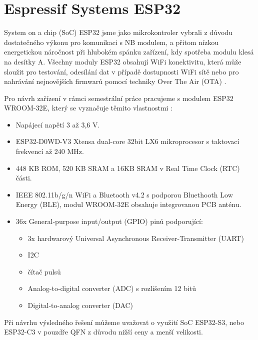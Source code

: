 \section{Espressif Systems ESP32}
\par System on a chip (SoC) ESP32 jsme jako mikrokontroler vybrali z důvodu dostatečného výkonu pro komunikaci s NB modulem, a přitom nízkou energetickou náročnost při hlubokém spánku zařízení, kdy spotřeba modulu klesá na desítky \mikro A. Všechny moduly ESP32 obsahují WiFi konektivitu, která může sloužit pro testování, odesílání dat v případě dostupnosti WiFi sítě nebo pro nahrávání nejnovějších firmwarů pomocí techniky Over The Air (OTA) \cite{UtwRiZcdaaRkidVE}.
\par Pro návrh zařízení v rámci semestrální práce pracujeme s modulem ESP32 WROOM-32E, který se vyznačuje těmito vlastnostmi \cite{UtwRiZcdaaRkidVE}:
    \begin{itemize}
        \item Napájecí napětí 3 až 3,6 V.
        \item ESP32-D0WD-V3 Xtensa dual-core 32bit LX6 mikroprocesor s taktovací frekvencí až 240 MHz.
        \item 448 KB ROM, 520 KB SRAM a 16KB SRAM v Real Time Clock (RTC) části.
        \item IEEE 802.11b/g/n WiFi a Bluetooth v4.2 s podporou Bluethooth Low Energy (BLE), modul WROOM-32E obsahuje integrovanou PCB anténu.
        \item 36x General-purpose input/output (GPIO) pinů podporující:
            \begin{itemize}
                \item 3x hardwarový Universal Asynchronous Receiver-Transmitter (UART)
                \item I2C
                \item čítač pulsů
                \item Analog-to-digital converter (ADC) s rozlišením 12 bitů
                \item Digital-to-analog converter (DAC)
            \end{itemize}
    \end{itemize}

\par Při návrhu výsledného řešení můžeme uvažovat o využití SoC ESP32-S3, nebo ESP32-C3 v pouzdře QFN z důvodu nižší ceny a menší velikosti.

